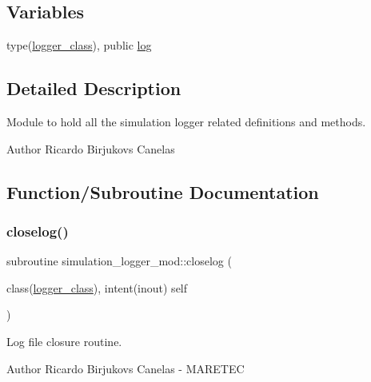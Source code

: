 \subsection*{Variables}
\begin{DoxyCompactItemize}
\item 
type(\hyperlink{structsimulation__logger__mod_1_1logger__class}{logger\+\_\+class}), public \hyperlink{namespacesimulation__logger__mod_aa778de9905350741e1f40bb04fdc1cf6}{log}
\end{DoxyCompactItemize}


\subsection{Detailed Description}
Module to hold all the simulation logger related definitions and methods. 

\begin{DoxyAuthor}{Author}
Ricardo Birjukovs Canelas 
\end{DoxyAuthor}


\subsection{Function/\+Subroutine Documentation}
\mbox{\label{namespacesimulation__logger__mod_aa6d1aaea74403186da0f98afb74ecebe}} 
\subsubsection{\texorpdfstring{closelog()}{closelog()}}
{\footnotesize\ttfamily subroutine simulation\+\_\+logger\+\_\+mod\+::closelog (\begin{DoxyParamCaption}\item[{class(\hyperlink{structsimulation__logger__mod_1_1logger__class}{logger\+\_\+class}), intent(inout)}]{self }\end{DoxyParamCaption})\hspace{0.3cm}{\ttfamily [private]}}



Log file closure routine. 

\begin{DoxyAuthor}{Author}
Ricardo Birjukovs Canelas -\/ M\+A\+R\+E\+T\+EC 
\end{DoxyAuthor}
\mbox{\label{namespacesimulation__logger__mod_a0326a5eeb649b041064a01d96aef0989}} 
